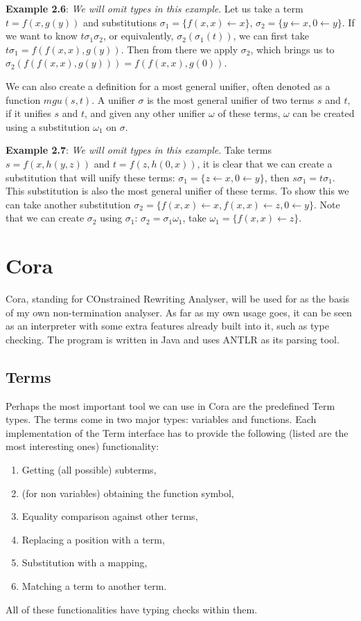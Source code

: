 \textbf{Example 2.6}: \textit{We will omit types in this example}. Let us take a term $t = f(x, g(y))$ and substitutions $\sigma_1 = \{ f(x, x) \leftarrow x\}$, $\sigma_2 = \{ y \leftarrow x, 0 \leftarrow y \}$. If we want to know $t\sigma_1\sigma_2$, or equivalently, $\sigma_2(\sigma_1(t))$, we can first take $t\sigma_1 = f(f(x, x), g(y))$. Then from there we apply $\sigma_2$, which brings us to $\sigma_2(f(f(x, x), g(y))) = f(f(x, x), g(0))$.

We can also create a definition for a most general unifier, often denoted as a function $\textit{mgu}(s, t)$. A unifier $\sigma$ is the most general unifier of two terms $s$ and $t$, if it unifies $s$ and $t$, and given any other unifier $\omega$ of these terms, $\omega$ can be created using a substitution $\omega_1$ on $\sigma$.

\textbf{Example 2.7}: \textit{We will omit types in this example}. Take terms $s = f(x, h(y, z))$ and $t = f(z, h(0, x))$, it is clear that we can create a substitution that will unify these terms: $\sigma_1 = \{ z \leftarrow x, 0 \leftarrow y \}$, then $s\sigma_1 = t\sigma_1$. This substitution is also the most general unifier of these terms. To show this we can take another substitution $\sigma_2 = \{ f(x, x) \leftarrow x, f(x, x) \leftarrow z, 0 \leftarrow y \}$. Note that we can create $\sigma_2$ using $\sigma_1$: $\sigma_2 = \sigma_1\omega_1$, take $\omega_1 = \{ f(x, x) \leftarrow z\}$.

\section{Cora}
Cora, standing for COnstrained Rewriting Analyser\cite{Cora2019}, will be used for as the basis of my own non-termination analyser. As far as my own usage goes, it can be seen as an interpreter with some extra features already built into it, such as type checking. The program is written in Java and uses ANTLR\cite{Parr:2013:DAR:2501720} as its parsing tool.

\subsection{Terms}
Perhaps the most important tool we can use in Cora are the predefined Term types. The terms come in two major types: variables and functions. Each implementation of the Term interface has to provide the following (listed are the most interesting ones) functionality: 
\begin{enumerate}
    \itemsep0em 
    \item Getting (all possible) subterms,
    \item (for non variables) obtaining the function symbol,
    \item Equality comparison against other terms,
    \item Replacing a position with a term,
    \item Substitution with a mapping,
    \item Matching a term to another term.
\end{enumerate}
All of these functionalities have typing checks within them. 
